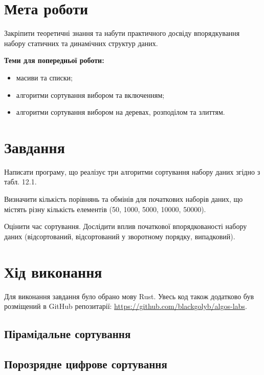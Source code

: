 \section{Мета роботи}
Закріпити теоретичні знання та набути практичного досвіду
впорядкування набору статичних та динамічних структур даних.

\noindent
\textbf{Теми для попередньої роботи:}
\begin{itemize}
    \item масиви та списки;
    \item алгоритми сортування вибором та включенням;
    \item алгоритми сортування вибором на деревах, розподілом та злиттям.
\end{itemize}


\section{Завдання}
Написати програму, що реалізує три алгоритми сортування набору
даних згідно з табл. 12.1.

Визначити кількість порівнянь та обмінів для початкових наборів
даних, що містять різну кількість елементів (50, 1000, 5000, 10000, 50000).

Оцінити час сортування. Дослідити вплив початкової впорядкованості
набору даних (відсортований, відсортований у зворотному порядку,
випадковий).


\section{Хід виконання}
Для виконання завдання було обрано мову Rust.
Увесь код також додатково був розміщений в GitHub репозитарії: \href{https://github.com/blackgolyb/algos-labs}{https://github.com/blackgolyb/algos-labs}.


\newpage
\subsection{Пірамідальне сортування}



\newpage
\subsection{Порозрядне цифрове сортування}



